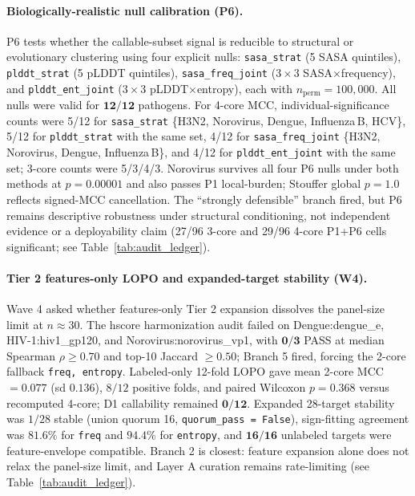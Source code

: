 \paragraph{Biologically-realistic null calibration (P6).}
\label{para:p6_biological_nulls}
P6 tests whether the callable-subset signal is reducible to structural or evolutionary clustering using four explicit nulls: \texttt{sasa\_strat} (5 SASA quintiles), \texttt{plddt\_strat} (5 pLDDT quintiles), \texttt{sasa\_freq\_joint} ($3\times3$ SASA$\times$frequency), and \texttt{plddt\_ent\_joint} ($3\times3$ pLDDT$\times$entropy), each with $n_{\text{perm}}=100{,}000$. All nulls were valid for $\mathbf{12/12}$ pathogens. For 4-core MCC, individual-significance counts were 5/12 for \texttt{sasa\_strat} \{H3N2, Norovirus, Dengue, Influenza\,B, HCV\}, 5/12 for \texttt{plddt\_strat} with the same set, 4/12 for \texttt{sasa\_freq\_joint} \{H3N2, Norovirus, Dengue, Influenza\,B\}, and 4/12 for \texttt{plddt\_ent\_joint} with the same set; 3-core counts were 5/3/4/3. Norovirus survives all four P6 nulls under both methods at $p = 0.00001$ and also passes P1 local-burden; Stouffer global $p=1.0$ reflects signed-MCC cancellation. The ``strongly defensible'' branch fired, but P6 remains descriptive robustness under structural conditioning, not independent evidence or a deployability claim (27/96 3-core and 29/96 4-core P1+P6 cells significant; see Table~\ref{tab:audit_ledger}).

\paragraph{Tier 2 features-only LOPO and expanded-target stability (W4).}
\label{para:w4_tier2_lopo}
Wave 4 asked whether features-only Tier 2 expansion dissolves the panel-size limit at $n \approx 30$. The hscore harmonization audit failed on Dengue:dengue\_e, HIV-1:hiv1\_gp120, and Norovirus:norovirus\_vp1, with $\mathbf{0/3}$ PASS at median Spearman $\rho \geq 0.70$ and top-10 Jaccard $\geq 0.50$; Branch 5 fired, forcing the 2-core fallback \texttt{freq, entropy}. Labeled-only 12-fold LOPO gave mean 2-core MCC $= 0.077$ (sd $0.136$), $8/12$ positive folds, and paired Wilcoxon $p = 0.368$ versus recomputed 4-core; D1 callability remained $\mathbf{0/12}$. Expanded 28-target stability was $1/28$ stable (union quorum 16, \texttt{quorum\_pass = False}), sign-fitting agreement was $81.6\%$ for \texttt{freq} and $94.4\%$ for \texttt{entropy}, and $\mathbf{16/16}$ unlabeled targets were feature-envelope compatible. Branch 2 is closest: feature expansion alone does not relax the panel-size limit, and Layer A curation remains rate-limiting (see Table~\ref{tab:audit_ledger}).

